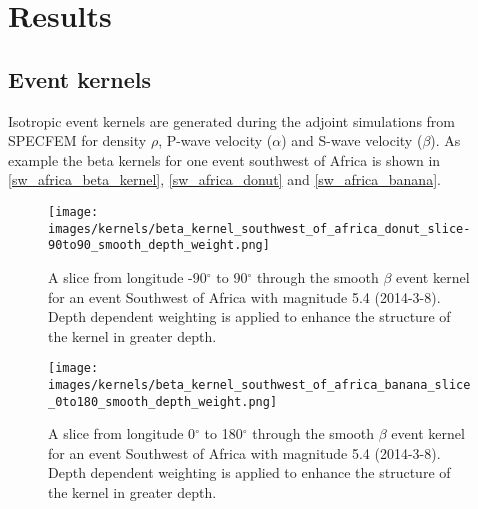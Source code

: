 
\chapter{Results}

\section{Event kernels}

Isotropic event kernels are generated during the adjoint simulations from SPECFEM for density $\rho$, P-wave velocity ($\alpha$) 
and S-wave velocity ($\beta$). As example the beta kernels for one event southwest of Africa is shown in \autoref{sw_africa_beta_kernel},
\autoref{sw_africa_donut} and \autoref{sw_africa_banana}.






\begin{figure}[h]
\begin{center}
\texttt{[image: images/kernels/beta\_kernel\_southwest\_of\_africa\_donut\_slice-90to90\_smooth\_depth\_weight.png]}
\caption[Slice from longitude -90$^\circ$ to 90$^\circ$ through the smooth $\beta$ event kernel for one event]{A slice from 
longitude -90$^\circ$ to 90$^\circ$ through the smooth $\beta$ event kernel for an event Southwest of Africa with 
magnitude 5.4 (2014-3-8). Depth dependent weighting is applied to enhance the structure of the kernel in greater depth.}  
\label{sw_africa_donut}
\texttt{[image: images/kernels/beta\_kernel\_southwest\_of\_africa\_banana\_slice\_0to180\_smooth\_depth\_weight.png]}
\caption[Slice from longitude 0$^\circ$ to 180$^\circ$ through the smooth $\beta$ event kernel for one event]{A slice from longitude 
0$^\circ$ to 180$^\circ$ through the smooth $\beta$ event kernel for an event Southwest of Africa with magnitude 5.4 (2014-3-8).
 Depth dependent weighting is applied to enhance the structure of the kernel in greater depth.}  
\label{sw_africa_banana}
\end{center}
\end{figure}


